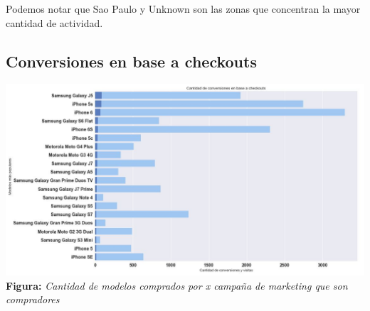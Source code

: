 \documentclass[titlepage,a4paper]{article}
\begin{document}
	Podemos notar que Sao Paulo y Unknown son las zonas que concentran la mayor cantidad de actividad.
		
	\subsection{Conversiones en base a checkouts}
	
	\begin{center}
	\includegraphics[width=16cm]{conversionesEnBaseACheckouts.jpg}\\
	\textbf{Figura:}  \textit{Cantidad de modelos comprados por \textit{x} campaña de marketing que son compradores}
	\end{center}
		
\end{document}
